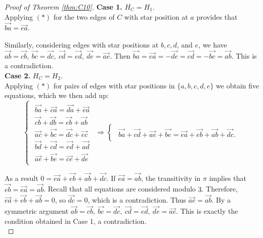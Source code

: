 \documentclass[11pt, a4paper]{article}
\begin{document}
\begin{proof}[Proof of Theorem \ref{thm:C10}]
{\bf Case 1.  } $H_C=H_1$.\\
Applying $(*)$ for the two edges of $C$ with star position at $a$ provides that $\overrightarrow{ba}=\overrightarrow{ea}$.
  
Similarly, considering edges with star positions at $b, c, d$, and $e$, we have 
$\overrightarrow{ab}=\overrightarrow{cb}, ~
\overrightarrow{bc}=\overrightarrow{dc}, ~
\overrightarrow{cd}=\overrightarrow{ed}, ~
\overrightarrow{de}=\overrightarrow{ae}.$
Then $\overrightarrow{ba}=\overrightarrow{ea}=-\overrightarrow{de}=\overrightarrow{cd}=-\overrightarrow{bc}=\overrightarrow{ab}$. This is a contradiction.
\\

{\bf Case 2.  } $H_C=H_2$.\\

Applying $(*)$ for pairs of edges with star positions in $\{a,b,c,d,e\}$ we obtain five equations, which we then add up:
$$\begin{cases}
\begin{array}{c}
\overrightarrow{ba}+\overrightarrow{ca}=\overrightarrow{da}+\overrightarrow{ea}\\
\overrightarrow{cb}+\overrightarrow{db}=\overrightarrow{eb}+\overrightarrow{ab}\\
\overrightarrow{ac}+\overrightarrow{bc}=\overrightarrow{dc}+\overrightarrow{ec}\\
\overrightarrow{bd}+\overrightarrow{cd}=\overrightarrow{ed}+\overrightarrow{ad}\\
\overrightarrow{ae}+\overrightarrow{be}=\overrightarrow{ce}+\overrightarrow{de}
\end{array}
\end{cases}
\Longrightarrow
\begin{cases}
\begin{array}{c}
\overrightarrow{ba}+\overrightarrow{cd}+\overrightarrow{ae}+\overrightarrow{be}=\overrightarrow{ea}+\overrightarrow{eb}+\overrightarrow{ab}+\overrightarrow{dc}.
\end{array}
\end{cases}$$

As a result $0=\overrightarrow{ea}+\overrightarrow{eb}+\overrightarrow{ab}+\overrightarrow{dc}$. 
If $\overrightarrow{ea} = \overrightarrow{ab}$, the transitivity in $\pi$ implies that $\overrightarrow{eb}=\overrightarrow{ea} = \overrightarrow{ab}$.
Recall that all equations are considered modulo $3$.
Therefore, $\overrightarrow{ea}+\overrightarrow{eb}+\overrightarrow{ab}=0$, so $\overrightarrow{dc}=0$, which is a contradiction.
Thus $\overrightarrow{ae} = \overrightarrow{ab}$. By a symmetric argument $\overrightarrow{ab}=\overrightarrow{cb}, ~
\overrightarrow{bc}=\overrightarrow{dc}, ~
\overrightarrow{cd}=\overrightarrow{ed}, ~
\overrightarrow{de}=\overrightarrow{ae}.$
This is exactly the condition obtained in Case 1, a contradiction.\\


\end{proof}
\end{document}
